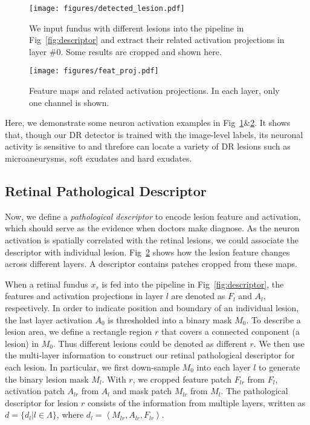 \documentclass[letterpaper]{article} %
\begin{document}
	\begin{figure}[t]
		\begin{center}
			\texttt{[image: figures/detected\_lesion.pdf]}
		\end{center}
		\caption{We input fundus with different lesions into the pipeline in Fig~\ref{fig:descriptor} and extract their related activation projections in layer \#0. Some results are cropped and shown here. }
		\label{fig:detected_lesion}
	\end{figure}

	\begin{figure}[t]
		\begin{center}
			\texttt{[image: figures/feat\_proj.pdf]}
		\end{center}
		\caption{Feature maps and related activation projections. In each layer, only one channel is shown. }
		\label{fig:feat_proj}
	\end{figure}

    Here, we demonstrate some neuron activation examples in Fig~\ref{fig:detected_lesion}\&\ref{fig:feat_proj}. It shows that, though our DR detector is trained with the image-level labels,
    its neuronal activity is sensitive to and threfore can locate a variety of DR lesions such as microaneurysms, soft exudates and hard exudates.


	\subsection{Retinal Pathological Descriptor}

    Now, we define a \emph{pathological descriptor} to encode lesion feature and activation, which should serve as the evidence when doctors make diagnose. As the neuron activation is spatially correlated with the retinal lesions, we could associate the descriptor with individual lesion.  Fig~\ref{fig:feat_proj} shows how the lesion feature changes across different layers. A descriptor contains patches cropped from these maps.


	When a retinal fundus $ x_s $ is fed into the pipeline in Fig~\ref{fig:descriptor}, the features and activation projections in layer $ l $ are denoted as $ F_l $ and $ A_l $, respectively. In order to indicate position and boundary of an individual lesion, the last layer activation $ A_0 $ is thresholded into a binary mask $ M_0 $. To describe a lesion area, we define a rectangle region $r$ that covers a connected conponent (a lesion) in $ M_0 $. Thus different lesions could be denoted as different $r$. We then use the multi-layer information to construct our retinal pathological descriptor for each lesion. In particular, we first down-sample $M_0$ into each layer $l$ to generate the binary lesion mask $M_l$. With $r$, we cropped feature patch $F_{lr}$ from $F_l$, activation patch $A_{lr}$ from $A_l$ and mask patch $M_{lr}$ from $M_l$. The pathological descriptor for lesion $r$ consists of the information from multiple layers, written as $d = \{d_{l}|l\in \Lambda\}$, where $ d_{l} = \left<M_{lr}, A_{lr}, F_{lr}\right> $.
\end{document}
